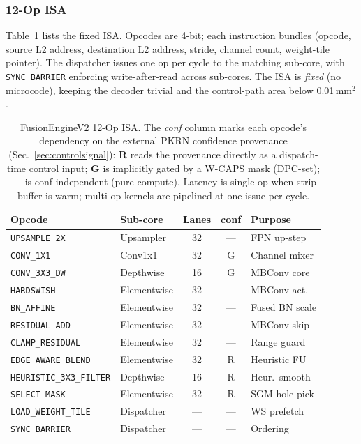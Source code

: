 \documentclass[journal]{IEEEtran}
\begin{document}
\subsubsection{12-Op ISA}
Table~\ref{tab:isa} lists the fixed ISA. Opcodes are 4-bit; each instruction bundles (opcode, source L2 address, destination L2 address, stride, channel count, weight-tile pointer). The dispatcher issues one op per cycle to the matching sub-core, with \texttt{SYNC\_BARRIER} enforcing write-after-read across sub-cores. The ISA is \emph{fixed} (no microcode), keeping the decoder trivial and the control-path area below 0.01\,mm$^2$.

\begin{table}[tb]
\caption{FusionEngineV2 12-Op ISA. The \emph{conf} column marks each opcode's dependency on the external PKRN confidence provenance (Sec.~\ref{sec:controlsignal}): \textbf{R} reads the provenance directly as a dispatch-time control input; \textbf{G} is implicitly gated by a W-CAPS mask (DPC-set); \textbf{---} is conf-independent (pure compute). Latency is single-op when strip buffer is warm; multi-op kernels are pipelined at one issue per cycle.}
\label{tab:isa}
\centering
\footnotesize
\setlength{\tabcolsep}{3pt}
\begin{tabular}{|l|l|c|c|l|}
\hline
\textbf{Opcode} & \textbf{Sub-core} & \textbf{Lanes} & \textbf{conf} & \textbf{Purpose} \\
\hline
\texttt{UPSAMPLE\_2X}           & Upsampler   & 32   & ---  & FPN up-step \\
\texttt{CONV\_1X1}              & Conv1x1     & 32   & G    & Channel mixer \\
\texttt{CONV\_3X3\_DW}          & Depthwise   & 16   & G    & MBConv core \\
\texttt{HARDSWISH}              & Elementwise & 32   & ---  & MBConv act. \\
\texttt{BN\_AFFINE}             & Elementwise & 32   & ---  & Fused BN scale \\
\texttt{RESIDUAL\_ADD}          & Elementwise & 32   & ---  & MBConv skip \\
\texttt{CLAMP\_RESIDUAL}        & Elementwise & 32   & ---  & Range guard \\
\texttt{EDGE\_AWARE\_BLEND}     & Elementwise & 32   & R    & Heuristic FU \\
\texttt{HEURISTIC\_3X3\_FILTER} & Depthwise   & 16   & R    & Heur.\ smooth \\
\texttt{SELECT\_MASK}           & Elementwise & 32   & R    & SGM-hole pick \\
\texttt{LOAD\_WEIGHT\_TILE}     & Dispatcher  & ---  & ---  & WS prefetch \\
\texttt{SYNC\_BARRIER}          & Dispatcher  & ---  & ---  & Ordering \\
\hline
\end{tabular}
\end{table}
\end{document}
